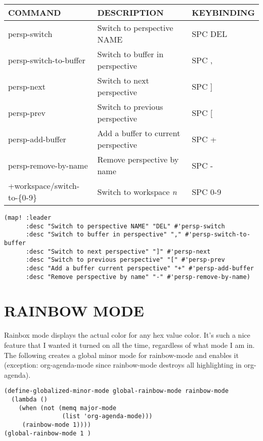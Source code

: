 \documentclass[11pt]{article}
\begin{document}
\begin{center}
\begin{tabular}{lll}
COMMAND & DESCRIPTION & KEYBINDING\\[0pt]
\hline
persp-switch & Switch to perspective NAME & SPC DEL\\[0pt]
persp-switch-to-buffer & Switch to buffer in perspective & SPC ,\\[0pt]
persp-next & Switch to next perspective & SPC ]\\[0pt]
persp-prev & Switch to previous perspective & SPC [\\[0pt]
persp-add-buffer & Add a buffer to current perspective & SPC +\\[0pt]
persp-remove-by-name & Remove perspective by name & SPC -\\[0pt]
+workspace/switch-to-\{0-9\} & Switch to workspace \emph{n} & SPC 0-9\\[0pt]
\end{tabular}
\end{center}

\begin{verbatim}
(map! :leader
      :desc "Switch to perspective NAME" "DEL" #'persp-switch
      :desc "Switch to buffer in perspective" "," #'persp-switch-to-buffer
      :desc "Switch to next perspective" "]" #'persp-next
      :desc "Switch to previous perspective" "[" #'persp-prev
      :desc "Add a buffer current perspective" "+" #'persp-add-buffer
      :desc "Remove perspective by name" "-" #'persp-remove-by-name)
\end{verbatim}

\section{RAINBOW MODE}
\label{sec:orgaeb6f09}
Rainbox mode displays the actual color for any hex value color.  It's such a nice feature that I wanted it turned on all the time, regardless of what mode I am in.  The following creates a global minor mode for rainbow-mode and enables it (exception: org-agenda-mode since rainbow-mode destroys all highlighting in org-agenda).

\begin{verbatim}
(define-globalized-minor-mode global-rainbow-mode rainbow-mode
  (lambda ()
    (when (not (memq major-mode
                (list 'org-agenda-mode)))
     (rainbow-mode 1))))
(global-rainbow-mode 1 )
\end{verbatim}
\end{document}
